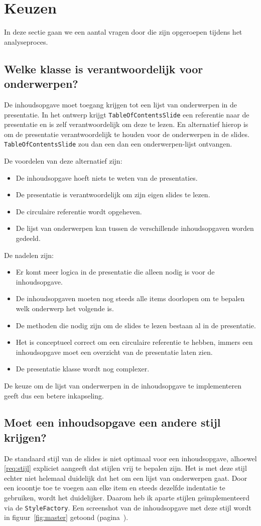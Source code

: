 \documentclass[a4paper]{article}
\newcommand{\reqref}[1]{\ref{req:#1}}
\newcommand{\question}[1]{
  \subsection{#1}
}
\newcommand{\code}[1]{\lstinline[columns=fixed]{#1}}
\begin{document}
\section{Keuzen}\label{sec:keuzen}
    In deze sectie gaan we een aantal vragen door die zijn opgeroepen tijdens het analyseproces.
   
    \question{Welke klasse is verantwoordelijk voor onderwerpen?}
		De inhoudsopgave moet toegang krijgen tot een lijst van onderwerpen in de presentatie.
		In het ontwerp krijgt \code{TableOfContentsSlide} een referentie naar de presentatie en is zelf verantwoordelijk om deze te lezen.
		En alternatief hierop is om de presentatie verantwoordelijk te houden voor de onderwerpen in de slides.
		\code{TableOfContentsSlide} zou dan een dan een onderwerpen-lijst ontvangen.

		De voordelen van deze alternatief zijn:
		\begin{itemize}
			\item De inhoudsopgave hoeft niets te weten van de presentaties.
			\item De presentatie is verantwoordelijk om zijn eigen slides te lezen.
			\item De circulaire referentie wordt opgeheven.
			\item De lijst van onderwerpen kan tussen de verschillende inhoudsopgaven worden gedeeld.
		\end{itemize}

		De nadelen zijn:
		\begin{itemize}
			\item Er komt meer logica in de presentatie die alleen nodig is voor de in\-houds\-op\-gave.
			\item De inhoudsopgaven moeten nog steeds alle items doorlopen om te bepalen welk onderwerp het volgende is.
			\item De methoden die nodig zijn om de slides te lezen bestaan al in de presentatie.
			\item Het is conceptueel correct om een circulaire referentie te hebben, immers een inhoudsopgave moet een overzicht van de presentatie laten zien.
			\item De presentatie klasse wordt nog complexer.
		\end{itemize}

		De keuze om de lijst van onderwerpen in de inhoudsopgave te implementeren geeft dus een betere inkapseling.

    \question{Moet een inhoudsopgave een andere stijl krijgen?}
		De standaard stijl van de slides is niet optimaal voor een inhoudsopgave, alhoewel \reqref{stijl} expliciet aangeeft dat stijlen vrij te bepalen zijn.
		Het is met deze stijl echter niet helemaal duidelijk dat het om een lijst van onderwerpen gaat.
		Door een icoontje toe te voegen aan elke item en steeds dezelfde indentatie te gebruiken, wordt het duidelijker.
		Daarom heb ik aparte stijlen geïmplementeerd via de \code{StyleFactory}.
		Een screenshot van de inhoudsopgave met deze stijl wordt in figuur~\ref{fig:master} getoond (pagina~\pageref{fig:master}).
\end{document}

